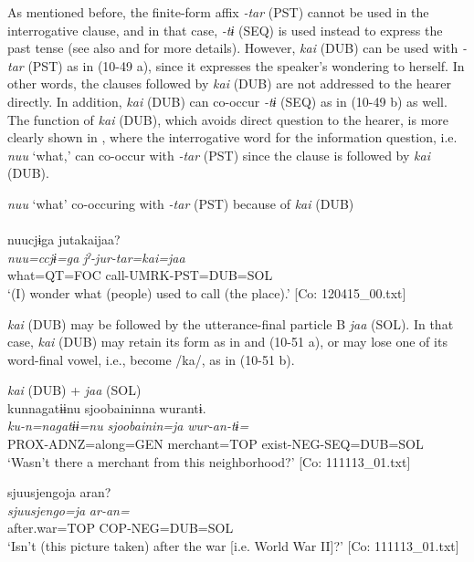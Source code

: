 As mentioned before, the finite-form affix \textit{{}-tar} (PST) cannot be used in the interrogative clause, and in that case, \textit{{}-tɨ} (SEQ) is used instead to express the past tense (see also  and  for more details). However, \textit{kai} (DUB) can be used with \textit{{}-tar} (PST) as in (10-49 a), since it expresses the speaker’s wondering to herself. In other words, the clauses followed by \textit{kai} (DUB) are not addressed to the hearer directly. In addition, \textit{kai} (DUB) can co-occur \textit{{}-tɨ} (SEQ) as in (10-49 b) as well. The function of \textit{kai} (DUB), which avoids direct question to the hearer, is more clearly shown in , where the interrogative word for the information question, i.e. \textit{nuu} ‘what,’ can co-occur with \textit{{}-tar} (PST) since the clause is followed by \textit{kai} (DUB).

\ea\label{ex:10.50}   \textit{nuu} ‘what’ co-occuring with \textit{{}-tar} (PST) because of \textit{kai} (DUB) \\\\
      \glll    nuucjɨga  jutakaijaa?\\
    \textit{nuu=ccjɨ=ga}  \textit{jˀ-jur-tar=kai=jaa}\\
    what=QT=FOC  call-UMRK-PST=DUB=SOL\\
\glt     ‘(I) wonder what (people) used to call (the place).’  [Co: 120415\_00.txt]
\z

\textit{kai} (DUB) may be followed by the utterance-final particle B \textit{jaa} (SOL). In that case, \textit{kai} (DUB) may retain its form as in  and (10-51 a), or may lose one of its word-final vowel, i.e., become /ka/, as in (10-51 b).

\ea\label{ex:10.51}   \textit{kai} (DUB) + \textit{jaa} (SOL)\\
  \ea  %
      \glll    kunnagatɨɨnu  {\textbar}sjoobainin{\textbar}na  wurantɨ.\\
      \textit{ku-n=nagatɨɨ=nu}  \textit{sjoobainin=ja}  \textit{wur-an-tɨ=}\\
      PROX-ADNZ=along=GEN  merchant=TOP  exist-NEG-SEQ=DUB=SOL\\
      \glt       ‘Wasn’t there a merchant from this neighborhood?’ [Co: 111113\_01.txt]

  \ex %
      \glll    {\textbar}sjuusjengo{\textbar}ja  aran?\\
      \textit{sjuusjengo=ja}  \textit{ar-an=}\\
      after.war=TOP  COP-NEG=DUB=SOL\\
      \glt       ‘Isn’t (this picture taken) after the war [i.e. World War II]?’ [Co: 111113\_01.txt]
    \z
\z

